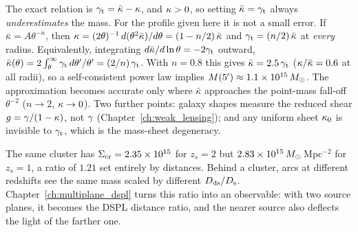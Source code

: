 \begin{annotation}
The exact relation is $\gamma_{\mathrm t} = \bar\kappa - \kappa$, and
$\kappa > 0$, so setting $\bar\kappa = \gamma_{\mathrm t}$ always
\emph{underestimates} the mass.  For the profile given here it is not a
small error.  If $\bar\kappa = A\theta^{-n}$, then
$\kappa = (2\theta)^{-1}\,d(\theta^2\bar\kappa)/d\theta = (1 - n/2)\,\bar\kappa$
and $\gamma_{\mathrm t} = (n/2)\,\bar\kappa$ at \emph{every} radius.
Equivalently, integrating $d\bar\kappa/d\ln\theta = -2\gamma_{\mathrm t}$
outward,
$\bar\kappa(\theta) = 2\int_\theta^\infty \gamma_{\mathrm t}\,
d\theta'/\theta' = (2/n)\,\gamma_{\mathrm t}$.  With $n = 0.8$ this gives
$\bar\kappa = 2.5\,\gamma_{\mathrm t}$ ($\kappa/\bar\kappa = 0.6$ at all
radii), so a self-consistent power law implies
$M(5') \approx 1.1\times 10^{15}\,M_{\odot}$.  The approximation becomes accurate only where
$\bar\kappa$ approaches the point-mass fall-off $\theta^{-2}$ ($n \to 2$,
$\kappa \to 0$).
Two further points: galaxy shapes measure the reduced shear
$g = \gamma/(1-\kappa)$, not $\gamma$ (Chapter~\ref{ch:weak_lensing}); and
any uniform sheet $\kappa_0$ is invisible to $\gamma_{\mathrm t}$, which is
the mass-sheet degeneracy.
\end{annotation}

\begin{bridge}
The same cluster has $\Sigma_{\mathrm{cr}} = 2.35\times 10^{15}$ for $z_s = 2$ but
$2.83\times 10^{15}\,M_{\odot}$\,Mpc$^{-2}$ for $z_s = 1$, a ratio of $1.21$ set
entirely by distances.  Behind a cluster, arcs at different redshifts see
the same mass scaled by different $D_{\mathrm{ds}}/D_{\mathrm{s}}$.
Chapter~\ref{ch:multiplane_dspl} turns this ratio into an observable: with
two source planes, it becomes the DSPL distance ratio, and the nearer
source also deflects the light of the farther one.
\end{bridge}
